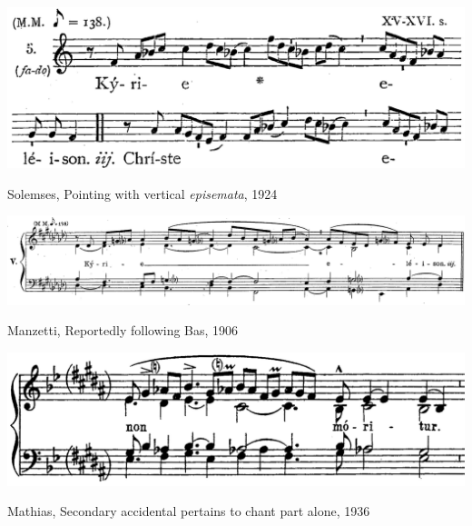 \begin{landscape}

  \vspace*{\fill}

  \begin{example}
    \centering
    \includegraphics[width=.5\linewidth]{c/4/ex/solesmes_liber_1924_39.png}
    \caption{Solemses, Pointing with vertical \emph{episemata}, 1924}
    \label{mus:solesmes_liber_1924_39}
  \end{example}

  \vspace*{\fill}

\end{landscape}

\begin{landscape}

  \vspace*{\fill}

  \begin{example}
    \centering
    \includegraphics[width=\linewidth]{c/4/ex/manzetti_angelis_48.png}
    \caption{Manzetti, Reportedly following Bas, 1906}
    \label{mus:manzetti_angelis_48}
  \end{example}

  \vspace*{\fill}

\end{landscape}

\vspace*{\fill}

\begin{example}
  \centering
  \includegraphics[width=\linewidth]{c/4/ex/mathias_secondary_89.png}
  \caption{Mathias, Secondary accidental pertains to chant part alone, 1936}
  \label{mus:mathias_secondary_89}
\end{example}

